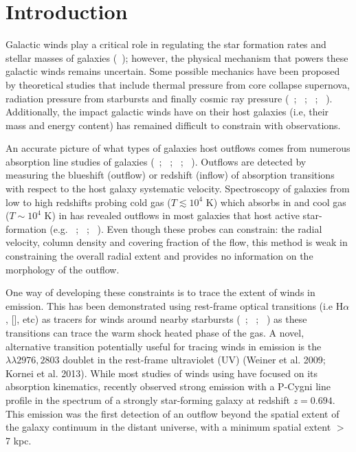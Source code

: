 \documentclass[twocolumn]{aastex61}
\newcommand{\citeth}[1]{(\citeauthor{#1}\ \citeyear{#1})}
\newcommand{\citethnop}[1]{\citeauthor{#1}\ \citeyear{#1}}
\begin{document}

\section{Introduction}\label{sec:intro}
Galactic winds play a critical role in regulating the star formation rates and stellar masses of galaxies \citeth{Werk_2014}; however, the physical mechanism that powers these galactic winds remains uncertain. Some possible mechanics have been proposed by theoretical studies that include thermal pressure from core collapse supernova, radiation pressure from starbursts and finally cosmic ray pressure (\citethnop{Larson_1974}; \citethnop{Chevalier_1985}; \citethnop{Springel_2003}; \citethnop{Sugahara_2017}). Additionally, the impact galactic winds have on their host galaxies (i.e, their mass and energy content) has remained difficult to constrain with observations.

An accurate picture of what types of galaxies host outflows comes from numerous absorption line studies of galaxies (\citethnop{Veilleux2005}; \citethnop{Weiner2009}; \citethnop{Martin2012}; \citethnop{Rubin_2014}). Outflows are detected by measuring the blueshift (outflow) or redshift (inflow) of absorption transitions with respect to the host galaxy systematic velocity. Spectroscopy of galaxies from low to high redshifts probing cold gas ($T \lesssim 10^4$ K) which absorbs in  and cool gas ($T \sim 10^4$ K) in  has revealed outflows in most galaxies that host active star-formation (e.g. \citethnop{chen2010}; \citethnop{Martin2012}; \citethnop{Rubin_2014}). Even though these probes can constrain: the radial velocity, column density and covering fraction of the flow, this method is weak in constraining the overall radial extent and provides no information on the morphology of the outflow.

One way of developing these constraints is to trace the extent of winds in emission. This has been demonstrated using rest-frame optical transitions (i.e H$\alpha$, [], etc) as tracers for winds around nearby starbursts (\citethnop{Matsubayashi2009}; \citethnop{Veilleux2009}; \citethnop{Tripp2011}) as these transitions can trace the warm shock heated phase of the gas. 
A novel, alternative transition potentially useful for tracing winds in emission is the  $\lambda\lambda 2976,2803$ doublet in the rest-frame ultraviolet (UV)
(Weiner et al. 2009; Kornei et al. 2013)\nocite{Weiner2009, Kornei2013}. While most studies of winds using  have focused on its absorption kinematics, \cite{Rubin_2011}  recently observed  strong  emission with a P-Cygni line profile in the spectrum of a strongly star-forming galaxy at redshift $z = 0.694$.  This emission was the first detection of an outflow beyond the spatial extent of the galaxy continuum in the distant universe, with a minimum spatial extent  $>$ 7 kpc.
\end{document}
